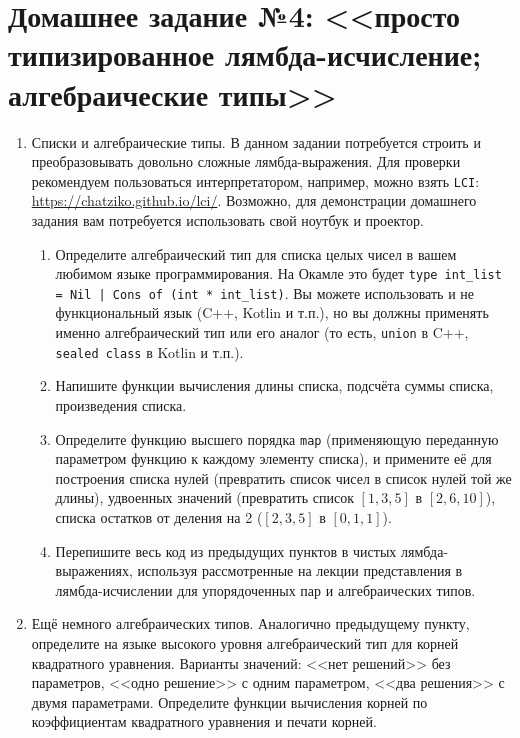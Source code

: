 \documentclass[10pt,a4paper,oneside]{article}
\begin{document}
\section*{Домашнее задание №4: <<просто типизированное лямбда-исчисление; алгебраические типы>>}

\begin{enumerate}
\item Списки и алгебраические типы.
  В данном задании потребуется строить и преобразовывать довольно сложные лямбда-выражения.
  Для проверки рекомендуем пользоваться интерпретатором, например, можно взять \verb!LCI!:
  \url{https://chatziko.github.io/lci/}. Возможно, для демонстрации домашнего задания
  вам потребуется использовать свой ноутбук и проектор.

  \begin{enumerate}
  \item Определите алгебраический тип для списка целых чисел в вашем любимом языке программирования.
        На Окамле это будет \verb!type int_list = Nil | Cons of (int * int_list)!. Вы можете использовать
        и не функциональный язык (C++, Kotlin и т.п.), но вы должны применять именно алгебраический тип
        или его аналог (то есть, \verb!union! в C++, \verb!sealed class! в Kotlin и т.п.).
  \item Напишите функции вычисления длины списка, подсчёта суммы списка, произведения списка.
  \item Определите функцию высшего порядка \verb!map! (применяющую переданную параметром функцию 
        к каждому элементу списка), и примените её для построения списка нулей 
        (превратить список чисел в список нулей той же длины), удвоенных значений
        (превратить список $[1,3,5]$ в $[2,6,10]$), списка остатков от деления на 2 ($[2,3,5]$ в $[0,1,1]$).
  \item Перепишите весь код из предыдущих пунктов в чистых лямбда-выражениях, используя рассмотренные
        на лекции представления в лямбда-исчислении для упорядоченных пар и алгебраических типов.
  \end{enumerate}

\item Ещё немного алгебраических типов.
  Аналогично предыдущему пункту, определите на языке высокого уровня алгебраический тип для корней 
  квадратного уравнения. Варианты значений: <<нет решений>> без параметров, <<одно решение>> 
  с одним параметром, <<два решения>> с двумя параметрами.
  Определите функции вычисления корней по коэффициентам квадратного уравнения и печати корней.


\end{enumerate}
\end{document}
